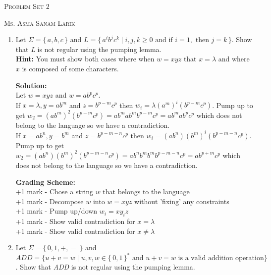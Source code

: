 \documentclass[11pt, article, oneside]{memoir}
\newcommand{\set}[1]{\{\, #1\, \}}
\begin{document}
\begin{center}
\LARGE{\textsc{Problem Set 2}}
 
\large{\textsc{Ms. Asma Sanam Larik}}
\end{center}

\begin{enumerate}
    \item
        Let \(\Sigma = \set{a, b, c}\) and \(L = \set{ {a^i}{b^j}{c^k} \mid i, j, k \ge 0 \text{ and if } i = 1,  \text{ then } j = k}\). Show that \textit{L} is not regular using the pumping lemma.
        \\\textbf{Hint:} You must show both cases where when \(w = xyz\) that \(x = \lambda\) and where \(x\) is composed of some characters.

        \textbf{Solution:}
        \\Let \(w = xyz\) and \(w = ab^pc^p\).
        \\If \(x = \lambda, y = ab^m\) and \(z = b^{p - m}c^p\) then \(w_i = \lambda(a^m)^i(b^{p - m}c^p)\). Pump up to get \(w_2 = (ab^m)^2(b^{p - m}c^p) = ab^mab^mb^{p - m}c^p = ab^mab^pc^p\) which does not belong to the language so we have a contradiction.
        \\If \(x = ab^n, y = b^m\) and \(z = b^{p - m - n}c^p\) then \(w_i = (ab^n)(b^m)^i(b^{p - m - n}c^p)\). Pump up to get \(w_2 = (ab^n)(b^m)^2(b^{p - m - n}c^p) = ab^nb^mb^mb^{p - m - n}c^p = ab^{p + m}c^p\) which does not belong to the language so we have a contradiction.

        \textbf{Grading Scheme:}
        \\+1 mark - Chose a string \(w\) that belongs to the language
        \\+1 mark - Decompose \(w\) into \(w = xyz\) without 'fixing' any constraints
        \\+1 mark - Pump up/down \(w_i = xy_iz\)
        \\+1 mark - Show valid contradiction for \(x = \lambda\)
        \\+1 mark - Show valid contradiction for \(x \neq \lambda\)
        
    \item 
        Let \(\Sigma = \set{0, 1, +, =}\) and \(ADD = \{ u+v=w \mid u, v, w \in \set{0, 1}^* \text{ and } u+v=w \text{ is a valid addition operation}\}\). Show that \textit{ADD} is not regular using the pumping lemma.
        

\end{enumerate}
\end{document}
